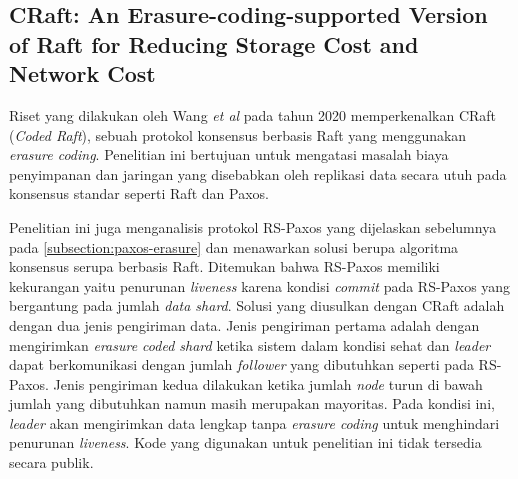 \subsection{CRaft: An Erasure-coding-supported Version of Raft for Reducing Storage Cost and Network Cost}
\label{subsection:craft}

Riset yang dilakukan oleh Wang \textit{et al} pada tahun 2020 memperkenalkan CRaft (\textit{Coded Raft}), sebuah protokol konsensus berbasis Raft yang menggunakan \textit{erasure coding}. Penelitian ini bertujuan untuk mengatasi masalah biaya penyimpanan dan jaringan yang disebabkan oleh replikasi data secara utuh pada konsensus standar seperti Raft dan Paxos.

Penelitian ini juga menganalisis protokol RS-Paxos yang dijelaskan sebelumnya pada \ref{subsection:paxos-erasure} dan menawarkan solusi berupa algoritma konsensus serupa berbasis Raft. Ditemukan bahwa RS-Paxos memiliki kekurangan yaitu penurunan \textit{liveness} karena kondisi \textit{commit} pada RS-Paxos yang bergantung pada jumlah \textit{data shard}. Solusi yang diusulkan dengan CRaft adalah dengan dua jenis pengiriman data. Jenis pengiriman pertama adalah dengan mengirimkan \textit{erasure coded shard} ketika sistem dalam kondisi sehat dan \textit{leader} dapat berkomunikasi dengan jumlah \textit{follower} yang dibutuhkan seperti pada RS-Paxos. Jenis pengiriman kedua dilakukan ketika jumlah \textit{node} turun di bawah jumlah yang dibutuhkan namun masih merupakan mayoritas. Pada kondisi ini, \textit{leader} akan mengirimkan data lengkap tanpa \textit{erasure coding} untuk menghindari penurunan \textit{liveness}. Kode yang digunakan untuk penelitian ini tidak tersedia secara publik.